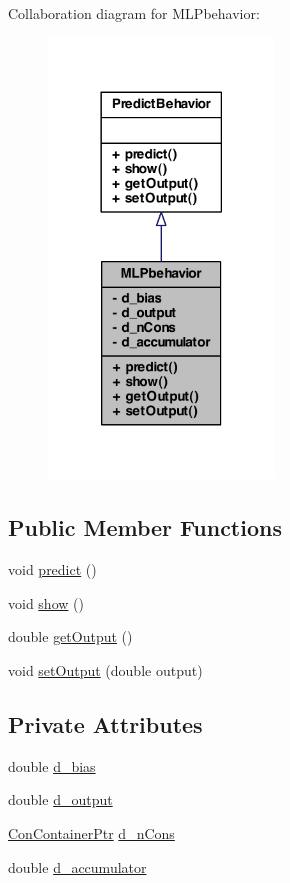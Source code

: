 Collaboration diagram for MLPbehavior:
\nopagebreak
\begin{figure}[H]
\begin{center}
\leavevmode
\includegraphics[width=170pt]{class_m_l_pbehavior__coll__graph}
\end{center}
\end{figure}
\subsection*{Public Member Functions}
\begin{DoxyCompactItemize}
\item 
void \hyperlink{class_m_l_pbehavior_aaff94adc3577cda9e48d8da925b0ffbf}{predict} ()
\item 
void \hyperlink{class_m_l_pbehavior_a32aa885e07e8f4eb33e05afb46040567}{show} ()
\item 
double \hyperlink{class_m_l_pbehavior_a52691223d1fb62ac9533af5d46f9a4c1}{getOutput} ()
\item 
void \hyperlink{class_m_l_pbehavior_a96424b39aa598ffec0baf5a53efe0ff8}{setOutput} (double output)
\end{DoxyCompactItemize}
\subsection*{Private Attributes}
\begin{DoxyCompactItemize}
\item 
double \hyperlink{class_m_l_pbehavior_a6206785c5c3f838a0538f9f77fa7a25a}{d\_\-bias}
\item 
double \hyperlink{class_m_l_pbehavior_a1a2045f66e72cd110227735ac0930900}{d\_\-output}
\item 
\hyperlink{_a_m_o_r_e_8h_a1021dbaf961d1c8da6d58a8566e5778b}{ConContainerPtr} \hyperlink{class_m_l_pbehavior_acb6e9681f06195ba1dd63bbafaa51d68}{d\_\-nCons}
\item 
double \hyperlink{class_m_l_pbehavior_a5e3dcaba201554283d27d58c6aa3ea82}{d\_\-accumulator}
\end{DoxyCompactItemize}
